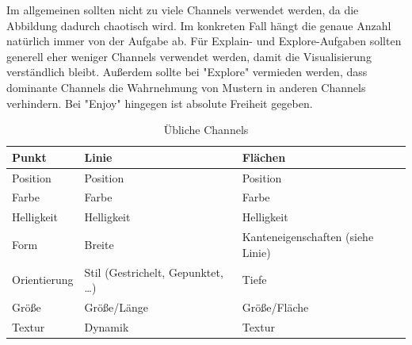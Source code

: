 			Im allgemeinen sollten nicht zu viele Channels verwendet werden, da die Abbildung dadurch chaotisch wird. Im konkreten Fall hängt die genaue Anzahl natürlich immer von der Aufgabe ab. Für Explain- und Explore-Aufgaben sollten generell eher weniger Channels verwendet werden, damit die Visualisierung verständlich bleibt. Außerdem sollte bei "Explore" vermieden werden, dass dominante Channels die Wahrnehmung von Mustern in anderen Channels verhindern. Bei "Enjoy" hingegen ist absolute Freiheit gegeben.

			\begin{table}
				\centering
				\begin{tabular}{l|l|l}
					\toprule
					\textbf{Punkt} & \textbf{Linie}                       & \textbf{Flächen}                  \\ \midrule
					Position       & Position                             & Position                          \\
					Farbe          & Farbe                                & Farbe                             \\
					Helligkeit     & Helligkeit                           & Helligkeit                        \\
					Form           & Breite                               & Kanteneigenschaften (siehe Linie) \\
					Orientierung   & Stil (Gestrichelt, Gepunktet, \dots) & Tiefe                             \\
					Größe          & Größe/Länge                          & Größe/Fläche                      \\
					Textur         & Dynamik                              & Textur                            \\ \bottomrule
				\end{tabular}
				\caption{Übliche Channels}
				\label{fig:channels}
			\end{table}


